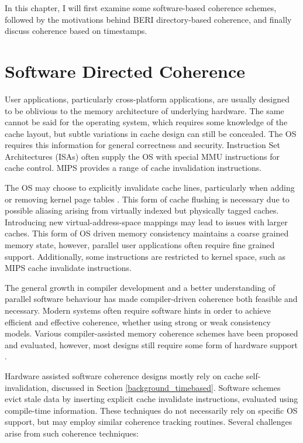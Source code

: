 	In this chapter, I will first examine some software-based coherence schemes, followed by the motivations behind BERI directory-based coherence, and finally discuss coherence based on timestamps.

	\section{Software Directed Coherence}
		User applications, particularly cross-platform applications, are usually designed to be oblivious to the memory architecture of underlying hardware. The same cannot be said for the operating system, which requires some knowledge of the cache layout, but subtle variations in cache design can still be concealed. The OS requires this information for general correctness and security. Instruction Set Architectures (ISAs) often supply the OS with special MMU instructions for cache control. MIPS provides a range of cache invalidation instructions.
		
		The OS may choose to explicitly invalidate cache lines, particularly when adding or removing kernel page tables \cite{Miller15}. This form of cache flushing is necessary due to possible aliasing arising from virtually indexed but physically tagged caches. Introducing new virtual-address-space mappings may lead to issues with larger caches. This form of OS driven memory consistency maintains a coarse grained memory state, however, parallel user applications often require fine grained support. Additionally, some instructions are restricted to kernel space, such as MIPS cache invalidate instructions.
		
		The general growth in compiler development and a better understanding of parallel software behaviour has made compiler-driven coherence both feasible and necessary. Modern systems often require software hints in order to achieve efficient and effective coherence, whether using strong or weak consistency models. 
		Various compiler-assisted memory coherence schemes have been proposed and evaluated, however, most designs still require some form of hardware support \cite{Lee98,Hwang96,Cheong88,Hoichi90,Choi94,Choi96,Choi00_0,Choi00_1,Fensch08}. 
		
		Hardware assisted software coherence designs mostly rely on cache self-invalidation, discussed in Section \ref{background_timebased}. 
		Software schemes evict stale data by inserting explicit cache invalidate instructions, evaluated using compile-time information. These techniques do not necessarily rely on specific OS support, but may employ similar coherence tracking routines. Several challenges arise from such coherence techniques:
		
